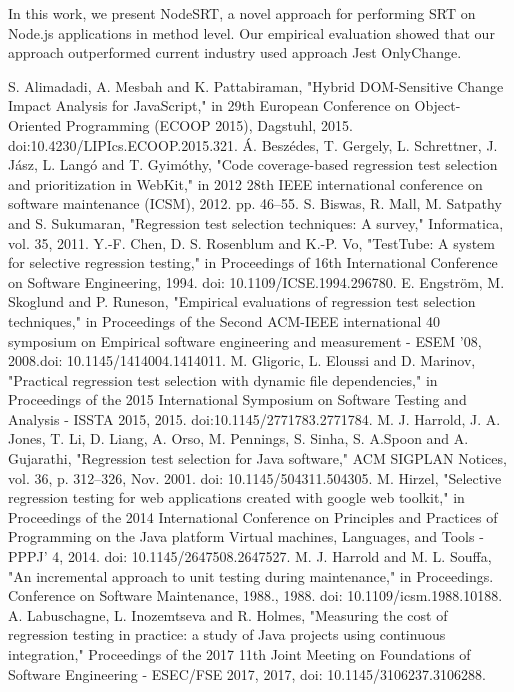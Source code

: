 \documentclass[10pt, conference]{IEEEtran}
\begin{document}
In this work, we present NodeSRT, a novel approach for performing SRT on Node.js applications in method level. Our empirical evaluation 
showed that our approach outperformed current industry used approach Jest OnlyChange.

\begin{thebibliography}{00}
 S. Alimadadi, A. Mesbah and K. Pattabiraman, "Hybrid DOM-Sensitive Change Impact Analysis for JavaScript," in 29th European Conference on Object-Oriented Programming (ECOOP 2015), Dagstuhl, 2015. doi:10.4230/LIPIcs.ECOOP.2015.321.
 Á. Beszédes, T. Gergely, L. Schrettner, J. Jász, L. Langó and T. Gyimóthy, "Code coverage-based regression test selection and prioritization in WebKit," in 2012 28th IEEE international conference on software maintenance (ICSM), 2012. pp. 46–55.
 S. Biswas, R. Mall, M. Satpathy and S. Sukumaran, "Regression test selection techniques: A survey," Informatica, vol. 35, 2011. 
 Y.-F. Chen, D. S. Rosenblum and K.-P. Vo, "TestTube: A system for selective regression testing," in Proceedings of 16th International Conference on Software Engineering, 1994. doi: 10.1109/ICSE.1994.296780.
 E. Engström, M. Skoglund and P. Runeson, "Empirical evaluations of regression test selection techniques," in Proceedings of the Second ACM-IEEE international 40 symposium on Empirical software engineering and measurement - ESEM '08, 2008.doi: 10.1145/1414004.1414011.
 M. Gligoric, L. Eloussi and D. Marinov, "Practical regression test selection with dynamic file dependencies," in Proceedings of the 2015 International Symposium on Software Testing and Analysis - ISSTA 2015, 2015. doi:10.1145/2771783.2771784.
 M. J. Harrold, J. A. Jones, T. Li, D. Liang, A. Orso, M. Pennings, S. Sinha, S. A.Spoon and A. Gujarathi, "Regression test selection for Java software," ACM SIGPLAN Notices, vol. 36, p. 312–326, Nov. 2001. doi: 10.1145/504311.504305.
 M. Hirzel, "Selective regression testing for web applications created with google web toolkit," in Proceedings of the 2014 International Conference on Principles and Practices of Programming on the Java platform Virtual machines, Languages, and Tools - PPPJ' 4, 2014. doi: 10.1145/2647508.2647527.
 M. J. Harrold and M. L. Souffa, "An incremental approach to unit testing during maintenance," in Proceedings. Conference on Software Maintenance, 1988., 1988. doi: 10.1109/icsm.1988.10188.
 A. Labuschagne, L. Inozemtseva and R. Holmes, "Measuring the cost of regression testing in practice: a study of Java projects using continuous integration," Proceedings of the 2017 11th Joint Meeting on Foundations of Software Engineering - ESEC/FSE 2017, 2017, doi: 10.1145/3106237.3106288.

\end{thebibliography}
\end{document}
